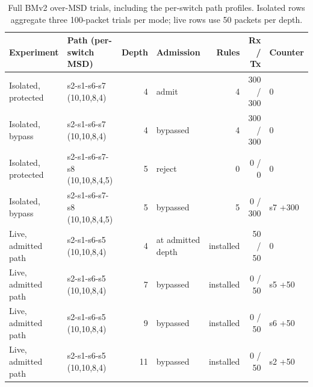 \documentclass[final,5p]{elsarticle}
\begin{document}
\begin{table}[p]
\centering
\caption{Full BMv2 over-MSD trials, including the per-switch path profiles. Isolated rows aggregate three 100-packet trials per mode; live rows use 50 packets per depth.}
\label{tab:hil_msd_detailed}
{\scriptsize%
\begin{tabular}{@{}llrlrrl@{}}
\toprule
Experiment & Path (per-switch MSD) & Depth & Admission & Rules & Rx / Tx & Counter \\
\midrule
Isolated, protected & s2-s1-s6-s7 (10,10,8,4) & 4 & admit & 4 & 300 / 300 & 0 \\
Isolated, bypass & s2-s1-s6-s7 (10,10,8,4) & 4 & bypassed & 4 & 300 / 300 & 0 \\
Isolated, protected & s2-s1-s6-s7-s8 (10,10,8,4,5) & 5 & reject & 0 & 0 / 0 & 0 \\
Isolated, bypass & s2-s1-s6-s7-s8 (10,10,8,4,5) & 5 & bypassed & 5 & 0 / 300 & s7 +300 \\
\midrule
Live, admitted path & s2-s1-s6-s5 (10,10,8,4) & 4 & at admitted depth & installed & 50 / 50 & 0 \\
Live, admitted path & s2-s1-s6-s5 (10,10,8,4) & 7 & bypassed & installed & 0 / 50 & s5 +50 \\
Live, admitted path & s2-s1-s6-s5 (10,10,8,4) & 9 & bypassed & installed & 0 / 50 & s6 +50 \\
Live, admitted path & s2-s1-s6-s5 (10,10,8,4) & 11 & bypassed & installed & 0 / 50 & s2 +50 \\
\bottomrule
\end{tabular}
}
\end{table}
\end{document}
